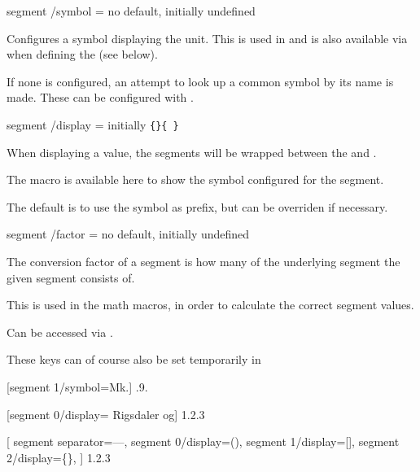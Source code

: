 \documentclass{article}
\begin{document}
\begin{docKey}
	[]
	[doc label=segment:symbol]
	{segment /symbol}
	{=}
	{no default, initially undefined}

	Configures a symbol displaying the unit. This is used in  and is also available via  when defining the  (see below).
	
	If none is configured, an attempt to look up a common symbol by its name is made. These can be configured with .
\end{docKey}

\begin{docKey}
	[]
	[doc label=segment:display]
	{segment /display}
	{=}
	{initially \texttt{\{\}\{ \}}}

	When displaying a value, the segments will be wrapped between the  and .
	
	The macro  is available here to show the symbol configured for the segment.
	
	The default is to use the symbol as prefix, but can be overriden if necessary.
\end{docKey}

\begin{docKey}
	[]
	[doc label=segment:factor]
	{segment /factor}
	{=}
	{no default, initially undefined}
	
	The conversion factor of a segment is how many of the underlying segment the given segment consists of.
	
	This is used in the math macros, in order to calculate the correct segment values.
	
	Can be accessed via .
\end{docKey}

These keys can of course also be set temporarily in 

\begin{dispExample}
	[segment 1/symbol=Mk.]
	{.9.}

	[segment 0/display={}{ Rigsdaler og}]
	{1.2.3}

[
		segment separator={---},
		segment 0/display={(}{)},
		segment 1/display={[}{]},
		segment 2/display={\{}{\}},
	]
	{1.2.3}
\end{dispExample}
\end{document}
